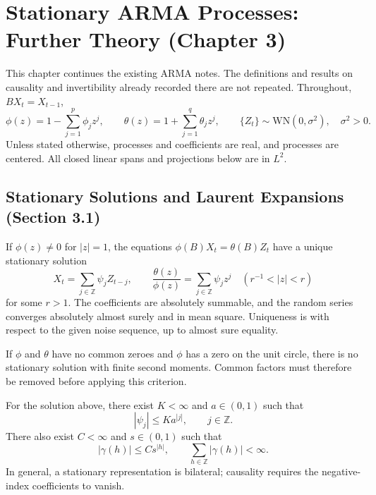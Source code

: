 \section{Stationary ARMA Processes: Further Theory (Chapter 3)}
\label{sec:tmts-ch3}
This chapter continues the existing ARMA notes. The definitions and results on
causality and invertibility already recorded there are not repeated.
Throughout, $B X_t=X_{t-1}$,
\[
\phi(z)=1-\sum_{j=1}^{p}\phi_jz^j,\qquad
\theta(z)=1+\sum_{j=1}^{q}\theta_jz^j,
\qquad \{Z_t\}\sim\mathrm{WN}(0,\sigma^2),\quad \sigma^2>0.
\]
Unless stated otherwise, processes and coefficients are real, and processes
are centered. All closed linear spans and projections below are in $L^2$.

\subsection{Stationary Solutions and Laurent Expansions (Section 3.1)}
\begin{theorem}
If $\phi(z)\ne0$ for $|z|=1$, the equations
$\phi(B)X_t=\theta(B)Z_t$ have a unique stationary solution
\[
X_t=\sum_{j\in\mathbb Z}\psi_jZ_{t-j},\qquad
\frac{\theta(z)}{\phi(z)}=\sum_{j\in\mathbb Z}\psi_jz^j
\quad(r^{-1}<|z|<r)
\]
for some $r>1$. The coefficients are absolutely summable, and the random
series converges absolutely almost surely and in mean square.
Uniqueness is with respect to the given noise sequence, up to almost sure equality.
\end{theorem}
\begin{proposition}
If $\phi$ and $\theta$ have no common zeroes and $\phi$ has a zero on the
unit circle, there is no stationary solution with finite second moments.
Common factors must therefore be removed before applying this criterion.
\end{proposition}
\begin{corollary}
For the solution above, there exist $K<\infty$ and $a\in(0,1)$ such that
\[
|\psi_j|\le K a^{|j|},\qquad j\in\mathbb Z.
\]
There also exist $C<\infty$ and $s\in(0,1)$ such that
\[
|\gamma(h)|\le C s^{|h|},\qquad
\sum_{h\in\mathbb Z}|\gamma(h)|<\infty.
\]
In general, a stationary representation is bilateral; causality requires the
negative-index coefficients to vanish.
\end{corollary}

